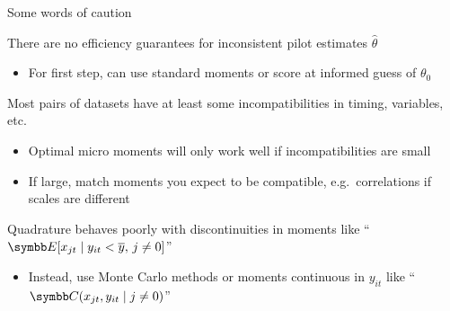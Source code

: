 \documentclass[aspectratio=169,10pt]{beamer}
\begin{document}
\begin{frame}{Some words of caution}
    \begin{wideitemize}
        \item There are no efficiency guarantees for \alert{inconsistent} pilot estimates $\hat{\theta}$
        \begin{itemize}
            \item For first step, can use standard moments or score at informed guess of $\theta_0$
        \end{itemize}
        
        \item Most pairs of datasets have at least some  \alert{incompatibilities} in timing, variables, etc.
        \begin{itemize}
            \item Optimal micro moments will only work well if incompatibilities are small
            \item If large, match moments you expect to be compatible, e.g.\ correlations if scales are different
        \end{itemize}
    
        \item Quadrature behaves poorly with \alert{discontinuities} in moments like ``$\E[x_{jt} \mid y_{it} < \overline{y}, \, j \neq 0]$''
        \begin{itemize}
            \item Instead, use Monte Carlo methods or moments continuous in $y_{it}$ like ``$\Cov(x_{jt}, y_{it} \mid j \neq 0)$''
        \end{itemize}
    \end{wideitemize}
\end{frame}
\end{document}
